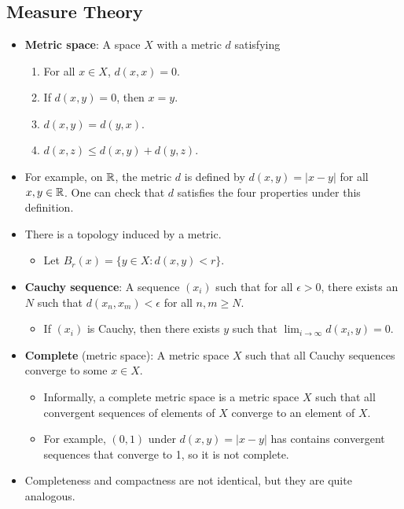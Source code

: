 \documentclass[../apprentice.tex]{subfiles}
\begin{document}
\chapter{}
\section{Measure Theory}
\begin{itemize}
    \item {}\textbf{Metric space}: A space $X$ with a metric $d$ satisfying
    \begin{enumerate}
        \item For all $x\in X$, $d(x,x)=0$.
        \item If $d(x,y)=0$, then $x=y$.
        \item $d(x,y)=d(y,x)$.
        \item $d(x,z)\leq d(x,y)+d(y,z)$.
    \end{enumerate}
    \item For example, on $\mathbb{R}$, the metric $d$ is defined by $d(x,y)=|x-y|$ for all $x,y\in\mathbb{R}$. One can check that $d$ satisfies the four properties under this definition.
    \item There is a topology induced by a metric.
    \begin{itemize}
        \item Let $B_r(x)=\{y\in X:d(x,y)<r\}$.
    \end{itemize}
    \item \textbf{Cauchy sequence}: A sequence $(x_i)$ such that for all $\epsilon>0$, there exists an $N$ such that $d(x_n,x_m)<\epsilon$ for all $n,m\geq N$.
    \begin{itemize}
        \item If $(x_i)$ is Cauchy, then there exists $y$ such that $\lim_{i\to\infty}d(x_i,y)=0$.
    \end{itemize}
    \item \textbf{Complete} (metric space): A metric space $X$ such that all Cauchy sequences converge to some $x\in X$.
    \begin{itemize}
        \item Informally, a complete metric space is a metric space $X$ such that all convergent sequences of elements of $X$ converge to an element of $X$.
        \item For example, $(0,1)$ under $d(x,y)=|x-y|$ has contains convergent sequences that converge to 1, so it is not complete.
    \end{itemize}
    \item Completeness and compactness are not identical, but they are quite analogous.

\end{itemize}
\end{document}
